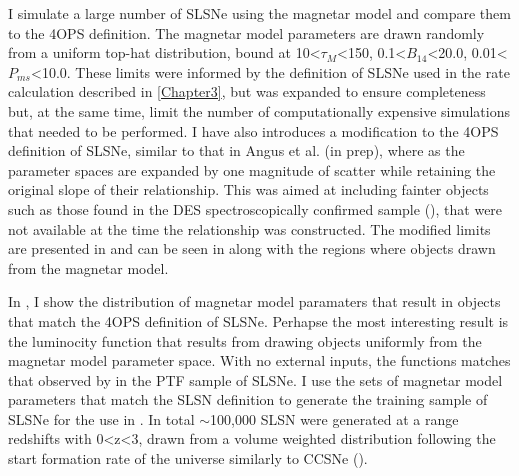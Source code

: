 I simulate a large number of SLSNe using the magnetar model and compare them to the 4OPS definition. The magnetar model parameters are drawn randomly from a uniform top-hat distribution, bound at 10<$\tau_M$<150, 0.1<$B_{14}$<20.0, 0.01<$P_{ms}$<10.0. These limits were informed by the definition of SLSNe used in the rate calculation described in \cref{Chapter3}, but was expanded to ensure completeness but, at the same time, limit the number of computationally expensive simulations that needed to be performed. I have also introduces a modification to the 4OPS definition of SLSNe, similar to that in Angus et al. (in prep), where as the parameter spaces are expanded by one magnitude of scatter while retaining the original slope of their relationship. This was aimed at including fainter objects such as those found in the DES spectroscopically confirmed sample (), that were not available at the time the relationship was constructed. The modified limits are presented in  and can be seen in  along with the regions where objects drawn from the magnetar model.

\begin{table}
  \caption{}
  \label{tab:4OPS}

\end{table}

\begin{figure}
  \caption{}
  \label{fig:4OPSMag}
\end{figure}

In , I show the distribution of magnetar model paramaters that result in objects that match the 4OPS definition of SLSNe. Perhapse the most interesting result is the luminocity function that results from drawing objects uniformly from the magnetar model parameter space. With no external inputs, the functions matches that observed by \citet{DeCia2017} in the PTF sample of SLSNe. I use the sets of magnetar model parameters that match the SLSN definition to generate the training sample of SLSNe for the use in . In total $\sim$100,000 SLSN were generated at a range redshifts with 0<z<3, drawn from a volume weighted distribution following the start formation rate of the universe \citep{Beacon2004} similarly to CCSNe ().

